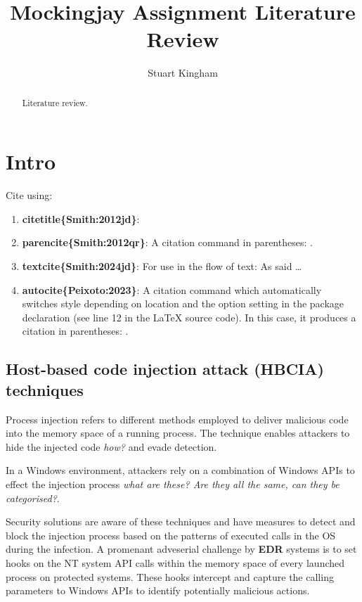 \documentclass{article}
\title{Mockingjay Assignment Literature Review}
\author{Stuart Kingham}
\begin{document}
\maketitle

\begin{abstract}
Literature review.
\end{abstract}

\tableofcontents

\section{Intro}

Cite using:
\begin{enumerate}
\item \textbf{citetitle\{Smith:2012jd\}}: 
\item \textbf{parencite\{Smith:2012qr\}}: A citation command in parentheses: \parencite{Smith:2023qr}.
\item \textbf{textcite\{Smith:2024jd\}}: For use in the flow of text: As \textcite{Smith:2024jd} said \dots
\item \textbf{autocite\{Peixoto:2023\}}: A citation command which automatically switches style depending on
  location and the option setting in the package declaration (see line 12 in the LaTeX source code). In this
  case, it produces a citation in parentheses: \autocite{Peixoto:2023}.
\end{enumerate}

\subsection{Host-based code injection attack (HBCIA) techniques}

Process injection refers to different methods employed to deliver malicious code into the memory space of a
running process.  The technique enables attackers to hide the injected code \textit{how?} and evade detection.

In a Windows \faWindows \space environment, attackers rely on a combination of Windows APIs to effect the injection
process \textit{what are these? Are they all the same, can they be categorised?}.

Security solutions are aware of these techniques and have measures to detect and block the injection process based
on the patterns of executed calls in the OS during the infection.  A promenant adveserial challenge by \textbf{EDR}
systems is to set hooks on the NT system API calls within the memory space of every launched process on protected
systems.  These hooks intercept and capture the calling parameters to Windows APIs to identify potentially malicious actions.
\end{document}

